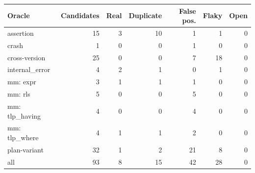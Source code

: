 \begin{tabular}{lrrrrrr}
    \toprule
    Oracle & Candidates & Real & Duplicate & False pos. & Flaky & Open \\
    \midrule
    assertion & 15 & 3 & 10 & 1 & 1 & 0 \\
    crash & 1 & 0 & 0 & 1 & 0 & 0 \\
    cross-version & 25 & 0 & 0 & 7 & 18 & 0 \\
    internal\_error & 4 & 2 & 1 & 0 & 1 & 0 \\
    mm: expr & 3 & 1 & 1 & 1 & 0 & 0 \\
    mm: rls & 5 & 0 & 0 & 5 & 0 & 0 \\
    mm: tlp\_having & 4 & 0 & 0 & 4 & 0 & 0 \\
    mm: tlp\_where & 4 & 1 & 1 & 2 & 0 & 0 \\
    plan-variant & 32 & 1 & 2 & 21 & 8 & 0 \\
    \midrule
    all & 93 & 8 & 15 & 42 & 28 & 0 \\
    \bottomrule
  \end{tabular}
